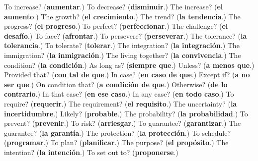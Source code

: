 \begin{tcolorbox}[breakable,colback=teal!4,colframe=teal!35!black,title={Before you move on}]
To increase? (\textbf{aumentar}.) To decrease? (\textbf{disminuir}.) The increase? (\textbf{el aumento}.) The growth? (\textbf{el crecimiento}.) The trend? (\textbf{la tendencia}.) The progress? (\textbf{el progreso}.) To perfect? (\textbf{perfeccionar}.) The challenge? (\textbf{el desafío}.) To face? (\textbf{afrontar}.) To persevere? (\textbf{perseverar}.) The tolerance? (\textbf{la tolerancia}.) To tolerate? (\textbf{tolerar}.) The integration? (\textbf{la integración}.) The immigration? (\textbf{la inmigración}.) The living together? (\textbf{la convivencia}.) The condition? (\textbf{la condición}.) As long as? (\textbf{siempre que}.) Unless? (\textbf{a menos que}.) Provided that? (\textbf{con tal de que}.) In case? (\textbf{en caso de que}.) Except if? (\textbf{a no ser que}.) On condition that? (\textbf{a condición de que}.) Otherwise? (\textbf{de lo contrario}.) In that case? (\textbf{en ese caso}.) In any case? (\textbf{en todo caso}.) To require? (\textbf{requerir}.) The requirement? (\textbf{el requisito}.) The uncertainty? (\textbf{la incertidumbre}.) Likely? (\textbf{probable}.) The probability? (\textbf{la probabilidad}.) To prevent? (\textbf{prevenir}.) To risk? (\textbf{arriesgar}.) To guarantee? (\textbf{garantizar}.) The guarantee? (\textbf{la garantía}.) The protection? (\textbf{la protección}.) To schedule? (\textbf{programar}.) To plan? (\textbf{planificar}.) The purpose? (\textbf{el propósito}.) The intention? (\textbf{la intención}.) To set out to? (\textbf{proponerse}.)
\end{tcolorbox}
